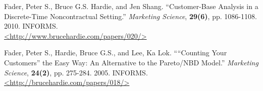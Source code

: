 \documentclass[10pt, letterpaper, onecolumn, oneside, final]{article}\usepackage[]{graphicx}\usepackage[]{color}
\begin{document}
Fader, Peter S., Bruce G.S. Hardie, and Jen
Shang. ``Customer-Base Analysis in a Discrete-Time Noncontractual Setting.'' \emph{Marketing Science}, \textbf{29(6)},
pp. 1086-1108. 2010. INFORMS.\\ \href{http://www.brucehardie.com/papers/020/}{\textless http://www.brucehardie.com/papers/020/\textgreater}

Fader, Peter S., Hardie, Bruce G.S., and Lee,
Ka Lok. ````Counting Your Customers'' the Easy Way: An Alternative to the Pareto/NBD Model.'' \emph{Marketing Science}, \textbf{24(2)},
pp. 275-284. 2005. INFORMS.\\ \href{http://brucehardie.com/papers/018/}{\textless http://brucehardie.com/papers/018/\textgreater}
\end{document}
